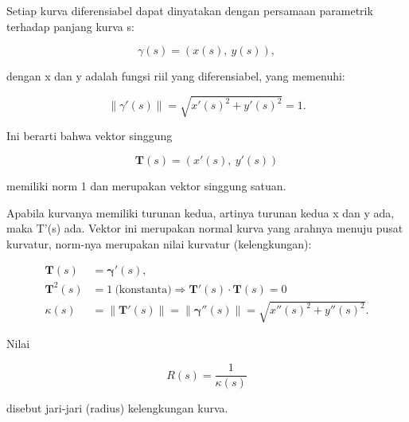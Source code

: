 \documentclass[a4paper,10pt]{article}
\begin{document}
\begin{eulernotebook}
\begin{eulercomment}
\begin{eulercomment}
\begin{eulercomment}
\begin{eulercomment}
\begin{eulercomment}
\end{eulercomment}
\begin{eulercomment}
Setiap kurva diferensiabel dapat dinyatakan dengan persamaan
parametrik terhadap panjang kurva s:

\end{eulercomment}
\begin{eulerformula}
\[
\gamma(s) = (x(s),\ y(s)),
\]
\end{eulerformula}
\begin{eulercomment}
dengan x dan y adalah fungsi riil yang diferensiabel, yang memenuhi:

\end{eulercomment}
\begin{eulerformula}
\[
\|\gamma'(s)\|=\sqrt{x'(s)^2+y'(s)^2}=1.
\]
\end{eulerformula}
\begin{eulercomment}
Ini berarti bahwa vektor singgung


\end{eulercomment}
\begin{eulerformula}
\[
\mathbf{T}(s)=(x'(s),\ y'(s))
\]
\end{eulerformula}
\begin{eulercomment}
memiliki norm 1 dan merupakan vektor singgung satuan.

Apabila kurvanya memiliki turunan kedua, artinya turunan kedua x dan y
ada, maka T'(s) ada. Vektor ini merupakan normal kurva yang arahnya
menuju pusat kurvatur, norm-nya merupakan nilai kurvatur
(kelengkungan):

\end{eulercomment}
\begin{eulerformula}
\[
 \begin{aligned}\mathbf{T}(s) &= \mathbf{\gamma}'(s),\\ \mathbf{T}^{2}(s) &=1\ \text{(konstanta)}\Rightarrow \mathbf{T}'(s)\cdot \mathbf{T}(s)=0\\ \kappa(s) &=\|\mathbf {T}'(s)\|= \|\mathbf{\gamma}''(s)\|=\sqrt{x''(s)^{2}+y''(s)^{2}}.\end{aligned}
\]
\end{eulerformula}
\begin{eulercomment}
Nilai

\end{eulercomment}
\begin{eulerformula}
\[
R(s)=\frac{1}{\kappa(s)}
\]
\end{eulerformula}
\begin{eulercomment}
disebut jari-jari (radius) kelengkungan kurva.


\end{eulercomment}
\end{eulercomment}
\end{eulercomment}
\end{eulercomment}
\end{eulercomment}
\end{eulernotebook}
\end{document}
